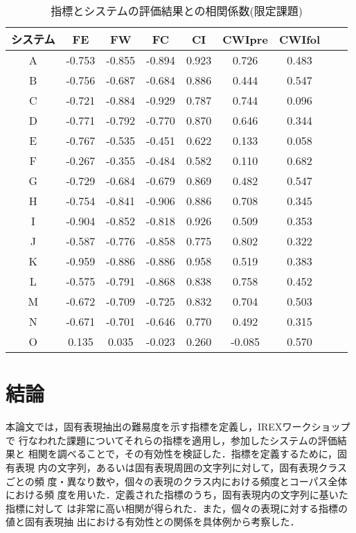 \begin{table*}
\begin{center}\small
\caption{指標とシステムの評価結果との相関係数(限定課題)}
\label{table:each_system_index_arrest}
\begin{tabular}{c|cccc|cccc} \hline
システム & FE     & FW     & FC     & CI    & CWIpre & CWIfol \\ \hline
A        & -0.753 & -0.855 & -0.894 & 0.923 & 0.726  & 0.483  \\       
B        & -0.756 & -0.687 & -0.684 & 0.886 & 0.444  & 0.547  \\       
C        & -0.721 & -0.884 & -0.929 & 0.787 & 0.744  & 0.096  \\       
D        & -0.771 & -0.792 & -0.770 & 0.870 & 0.646  & 0.344  \\       
E        & -0.767 & -0.535 & -0.451 & 0.622 & 0.133  & 0.058  \\       
F        & -0.267 & -0.355 & -0.484 & 0.582 & 0.110  & 0.682  \\       
G        & -0.729 & -0.684 & -0.679 & 0.869 & 0.482  & 0.547  \\       
H        & -0.754 & -0.841 & -0.906 & 0.886 & 0.708  & 0.345  \\       
I        & -0.904 & -0.852 & -0.818 & 0.926 & 0.509  & 0.353  \\       
J        & -0.587 & -0.776 & -0.858 & 0.775 & 0.802  & 0.322  \\       
K        & -0.959 & -0.886 & -0.886 & 0.958 & 0.519  & 0.383  \\       
L        & -0.575 & -0.791 & -0.868 & 0.838 & 0.758  & 0.452  \\       
M        & -0.672 & -0.709 & -0.725 & 0.832 & 0.704  & 0.503  \\       
N        & -0.671 & -0.701 & -0.646 & 0.770 & 0.492  & 0.315  \\       
O        & 0.135  & 0.035  & -0.023 & 0.260 & -0.085 & 0.570  \\ \hline
\end{tabular}
\end{center}
\end{table*}



\section{結論}

本論文では，固有表現抽出の難易度を示す指標を定義し，IREXワークショップで
行なわれた課題についてそれらの指標を適用し，参加したシステムの評価結果と
相関を調べることで，その有効性を検証した．指標を定義するために，固有表現
内の文字列，あるいは固有表現周囲の文字列に対して，固有表現クラスごとの頻
度・異なり数や，個々の表現のクラス内における頻度とコーパス全体における頻
度を用いた．定義された指標のうち，固有表現内の文字列に基いた指標に対して
は非常に高い相関が得られた．また，個々の表現に対する指標の値と固有表現抽
出における有効性との関係を具体例から考察した．

